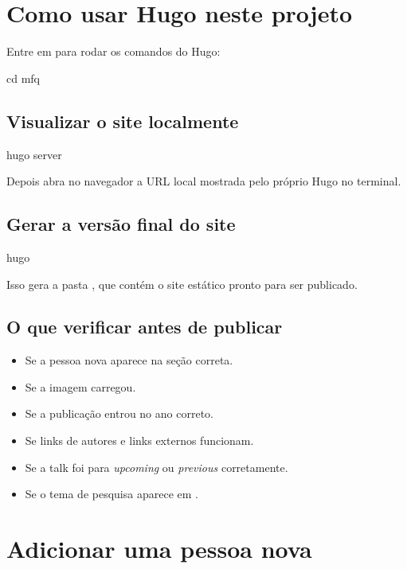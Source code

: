 \documentclass[11pt,a4paper]{article}
\begin{document}
\section{Como usar Hugo neste projeto}

Entre em  para rodar os comandos do Hugo:

\begin{terminal}
cd mfq
\end{terminal}

\subsection{Visualizar o site localmente}

\begin{terminal}
hugo server
\end{terminal}

Depois abra no navegador a URL local mostrada pelo próprio Hugo no terminal.

\subsection{Gerar a versão final do site}

\begin{terminal}
hugo
\end{terminal}

Isso gera a pasta , que contém o site estático pronto para ser publicado.

\subsection{O que verificar antes de publicar}

\begin{itemize}
  \item Se a pessoa nova aparece na seção correta.
  \item Se a imagem carregou.
  \item Se a publicação entrou no ano correto.
  \item Se links de autores e links externos funcionam.
  \item Se a talk foi para \emph{upcoming} ou \emph{previous} corretamente.
  \item Se o tema de pesquisa aparece em .
\end{itemize}

\section{Adicionar uma pessoa nova}
\end{document}
